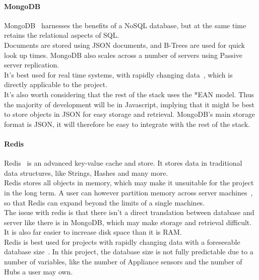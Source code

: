 \documentclass[draft,preprint,12pt,3p]{elsarticle}
\begin{document}
\paragraph{MongoDB}
MongoDB~\cite{mongodb} harnesses the benefits of a NoSQL database, but at the same time retains the relational aspects of SQL.\\
Documents are stored using JSON documents, and B-Trees are used for quick look up times. MongoDB also scales across a number of servers using Passive server replication.\\
It's best used for real time systems, with rapidly changing data~\cite{databasecomparison}, which is directly applicable to the project.\\
It's also worth considering that the rest of the stack uses the *EAN model. Thus the majority of development will be in Javascript, implying that it might be best to store objects in JSON for easy storage and retrieval. MongoDB's main storage format is JSON, it will therefore be easy to integrate with the rest of the stack. 

\paragraph{Redis}
Redis~\cite{redis} is an advanced key-value cache and store. It stores data in traditional data structures, like Strings, Hashes and many more.\\
Redis stores all objects in memory, which may make it unsuitable for the project in the long term. A user can however partition memory across server machines~\cite{redisfaq}, so that Redis can expand beyond the limits of a single machines.\\
The issue with redis is that there isn't a direct translation between database and server like there is in MongoDB, which may make storage and retrieval difficult. It is also far easier to increase disk space than it is RAM.\\
Redis is best used for projects with rapidly changing data with a foreseeable database size~\cite{databasecomparison}. In this project, the database size is not fully predictable due to a number of variables, like the number of Appliance sensors and the number of Hubs a user may own.
\end{document}

